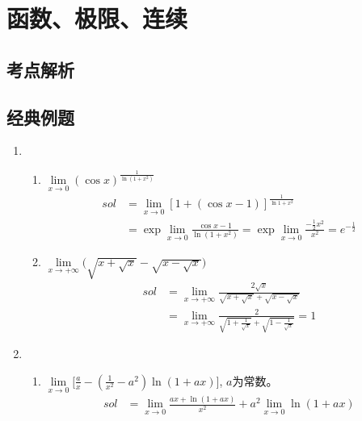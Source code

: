\chapter{函数、极限、连续}
\section{考点解析} %
\label{sec:考点解析}


\section{经典例题} %
\label{sec:经典例题}

\begin{enumerate}[{例}1.]
    \item   
        \begin{enumerate}[(1)]
            \item $\lim\limits_{x\to 0}(\cos x)^{\frac{1}{\ln{(1+x^2)}}}$
                    \begin{align*}
                    sol&=\lim_{x\to0}\left[1+(\cos x-1)\right]^\frac{1}{\ln{1+x^2}}\\
                        &=\exp{\lim_{x\to0}\frac{\cos x-1}{\ln(1+x^2)}}
                        =\exp{\lim_{x\to0}\frac{-\frac{1}{2}x^2}{x^2}}
                        =e^{-\frac{1}{2}}
                    \end{align*}
            \item $\lim\limits_{x\to+{\infty}}\Big(\sqrt{x+\sqrt{x}}-\sqrt{x-\sqrt{x}}\Big)$
                \begin{align*}
                    sol&=\lim_{x\to+\infty}\frac{2\sqrt{x}}{\sqrt{x+\sqrt{x}}+\sqrt{x-\sqrt{x}}}\\
                       &=\lim_{x\to+\infty}\frac{2}{\sqrt{1+\frac{1}{\sqrt{x}}}+\sqrt{1-\frac{1}{\sqrt{x}}}}
                        =1
                \end{align*}
        \end{enumerate}
    \item   
        \begin{enumerate}[(1)]
            \item $\lim\limits_{x\to0}\Big[\frac{a}{x}-(\frac{1}{x^2}-a^2)\ln{(1+ax)}\Big]$, $a$为常数。
                \begin{align*}
                    sol&=\lim_{x\to0}\frac{ax+\ln{(1+ax)}}{x^2}+a^2\lim_{x\to0}\ln{(1+ax)}\\

\end{align*}
\end{enumerate}
\end{enumerate}
